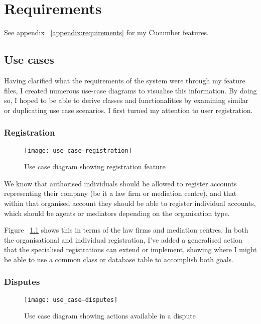 \chapter{Requirements}

See appendix ~\ref{appendix:requirements} for my Cucumber features.


\section{Use cases}

Having clarified what the requirements of the system were through my feature files, I created numerous use-case diagrams to visualise this information. By doing so, I hoped to be able to derive classes and functionalities by examining similar or duplicating use case scenarios. I first turned my attention to user registration.

\subsection{Registration}

\begin{figure}[h!]
  \centering
    \texttt{[image: use\_case--registration]}
  \caption{Use case diagram showing registration feature}
  \label{uml:useCase:registration}
\end{figure}

We know that authorised individuals should be allowed to register accounts representing their company (be it a law firm or mediation centre), and that within that organised account they should be able to register individual accounts, which should be agents or mediators depending on the organisation type.

Figure ~\ref{uml:useCase:registration} shows this in terms of the law firms and mediation centres. In both the organisational and individual registration, I've added a generalised action that the specialised registrations can extend or implement, showing where I might be able to use a common class or database table to accomplish both goals.

\subsection{Disputes}

\begin{figure}[h!]
  \centering
    \texttt{[image: use\_case--disputes]}
  \caption{Use case diagram showing actions available in a dispute}
  \label{uml:useCase:disputes}
\end{figure}

